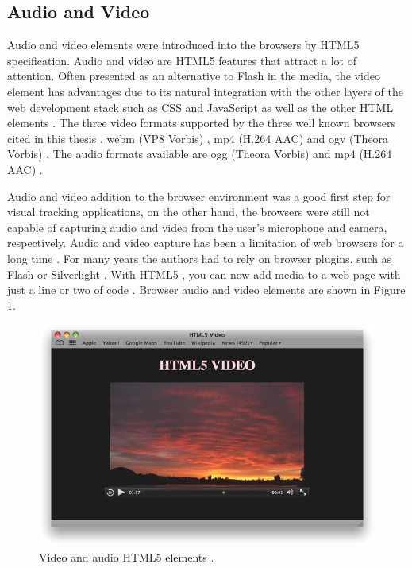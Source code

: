 
\subsection{Audio and Video} %
\label{sub:basic_concepts:web:audio_and_video}

Audio and video elements were introduced into the browsers by HTML5 \cite{Hickson2013} specification. Audio and video are HTML5 \cite{Hickson2013} features that attract a lot of attention. Often presented as an alternative to Flash \cite{Flash2013} in the media, the video element has advantages due to its natural integration with the other layers of the web development stack such as CSS \cite{CSS2013} and JavaScript \cite{International2009} as well as the other HTML elements \cite{WC2006}. The three video formats supported by the three well known browsers cited in this thesis \cite{WC2006,Rocks2013}, webm (VP8 Vorbis) \cite{Vorbis2012}, mp4 (H.264 AAC) \cite{AAC2006} and ogv (Theora Vorbis) \cite{Theora2011}. The audio formats available are ogg (Theora Vorbis) \cite{Theora2011} and mp4 (H.264 AAC) \cite{AAC2006}.

Audio and video addition to the browser environment was a good first step for visual tracking applications, on the other hand, the browsers were still not capable of capturing audio and video from the user's microphone and camera, respectively. Audio and video capture has been a limitation of web browsers for a long time \cite{Hickson2013}. For many years the authors had to rely on browser plugins, such as Flash \cite{Flash2013} or Silverlight \cite{Silverlight2013,Rocks2013}. With HTML5 \cite{Hickson2013}, you can now add media to a web page with just a line or two of code \cite{WebKit2013}. Browser audio and video elements \cite{Hickson2013} are shown in Figure \ref{figure:html5_audio_video}.

\begin{figure}[!htb]
  \centering
  \includegraphics[width=380pt]{chapters/basic_concepts/html5_audio_video.png}
  \caption{Video and audio HTML5 elements \cite{WebKit2013}.}
  \label{figure:html5_audio_video}
\end{figure}

